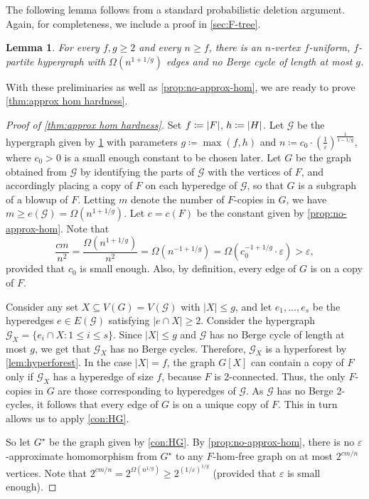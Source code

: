\documentclass[reqno, english, 12pt]{amsart}
\theoremstyle{plain}
\newtheorem{lemma}[theorem]{Lemma}
\theoremstyle{remark}
\DeclarePairedDelimiter{\abs}{\lvert}{\rvert}
\renewcommand{\leq}{\leqslant}
\renewcommand{\geq}{\geqslant}
\begin{document}
	The following lemma follows from a standard probabilistic deletion argument. Again, for completeness, we include a proof in \cref{sec:F-tree}. 
	\begin{lemma}\label{lem:high-girth hypergraph}
		For every $f,g \geq 2$ and every $n\geq f$, there is an $n$-vertex $f$-uniform, $f$-partite hypergraph with $\Omega(n^{1+1/g})$ edges and no Berge cycle of length at most $g$.
	\end{lemma}
	\noindent
	With these preliminaries as well as \cref{prop:no-approx-hom}, we are ready to prove \cref{thm:approx hom hardness}.
	\begin{proof}[Proof of \cref{thm:approx hom hardness}]
	Set $f \coloneqq \abs F$, $h \coloneqq \abs H$.
	Let $\mathcal{G}$ be the hypergraph given by \cref{lem:high-girth hypergraph} with parameters $g \coloneqq \max(f,h)$ and $n \coloneqq c_0\cdot (\frac{1}{\varepsilon})^{\frac{1}{1-1/g}}$, where $c_0 > 0$ is a small enough constant to be chosen later. 
	{Let $G$ be the graph obtained from $\mathcal{G}$ by identifying the parts of $\mathcal{G}$ with the vertices of $F$, and accordingly placing a copy of $F$ on each hyperedge of $\mathcal{G}$, so that $G$ is a subgraph of a blowup of $F$.} 
	Letting $m$ denote the number of $F$-copies in $G$, we have $m \geq e(\mathcal G)= \Omega(n^{1 + 1/g})$. 
	Let $c = c(F)$ be the constant given by \cref{prop:no-approx-hom}.
	Note that 
	$$
	\frac{cm}{n^2} = \frac{\Omega(n^{1+1/g})}{n^2} = \Omega(n^{-1+1/g}) = \Omega( c_0^{-1+1/g} \cdot \varepsilon ) > \varepsilon,
	$$
	provided that $c_0$ is small enough. 
    Also, by definition, every edge of $G$ is on a copy of $F$. 


    Consider any set $X \subseteq V(G) = V(\mathcal{G})$ with $|X| \leq g$, and let $e_1,\dots,e_s$ be the hyperedges $e \in E(\mathcal{G})$ satisfying $|e \cap X| \geq 2$.  Consider the hypergraph 
    $\mathcal{G}_X = \{e_i \cap X : 1 \leq i \leq s\}$. Since $|X| \leq g$ and $\mathcal{G}$ has no Berge cycle of length at most $g$, we get that $\mathcal{G}_X$ has no Berge cycles. Therefore, $\mathcal{G}_X$ is a hyperforest by \cref{lem:hyperforest}. 
    In the case $|X| = f$, the graph $G[X]$ can contain a copy of $F$ only if $\mathcal{G}_X$ has a hyperedge of size $f$, because $F$ is 2-connected.
    Thus, the only $F$-copies in $G$ are those corresponding to hyperedges of $\mathcal{G}$. 
    As $\mathcal{G}$ has no Berge 2-cycles, it follows that every edge of $G$ is on a unique copy of $F$. This in turn allows us to apply \cref{con:HG}. 
    
	So let $G^{\star}$ be the graph given by \cref{con:HG}. 
	By \cref{prop:no-approx-hom}, there is no $\varepsilon$-approximate homomorphism from $G^{\star}$ to any $F$-hom-free graph on at most $2^{cm/n}$ vertices. Note that $2^{cm/n} = 2^{\Omega(n^{1/g})} \geq 2^{(1/\varepsilon)^{1/g}}$ (provided that $\varepsilon$ is small enough). 


\end{proof}
\end{document}
